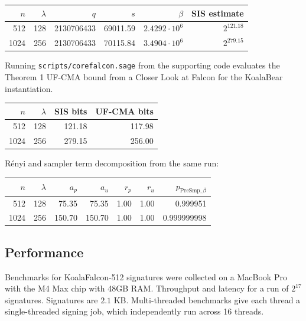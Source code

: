 \begin{center}
\begin{tabular}{@{}rrrrrr@{}}
\toprule
$n$ & $\lambda$ & $q$ & $s$ & $\beta$ & SIS estimate \\
\midrule
512 & 128 & 2130706433 & 69011.59 & $2.4292\cdot 10^6$ & $2^{121.18}$ \\
1024 & 256 & 2130706433 & 70115.84 & $3.4904\cdot 10^6$ & $2^{279.15}$ \\
\bottomrule
\end{tabular}
\end{center}

Running \texttt{scripts/corefalcon.sage} from the supporting code evaluates the Theorem 1 UF-CMA 
bound from a Closer Look at Falcon for the KoalaBear instantiation. 

\begin{center}
\begin{tabular}{@{}rrrr@{}}
\toprule
$n$ & $\lambda$ & SIS bits & UF-CMA bits \\
\midrule
512 & 128 & 121.18 & 117.98 \\
1024 & 256 & 279.15 & 256.00 \\
\bottomrule
\end{tabular}
\end{center}

Rényi and sampler term decomposition from the same run:

\begin{center}
\begin{tabular}{@{}rrrrrrr@{}}
\toprule
$n$ & $\lambda$ & $a_p$ & $a_u$ & $r_p$ & $r_u$ & $p_{\mathrm{PreSmp},\beta}$ \\
\midrule
512 & 128 & 75.35 & 75.35 & 1.00 & 1.00 & 0.999951 \\
1024 & 256 & 150.70 & 150.70 & 1.00 & 1.00 & 0.999999998 \\
\bottomrule
\end{tabular}
\end{center}


\subsection{Performance}

Benchmarks for KoalaFalcon-512 signatures were collected on a MacBook Pro with the M4 Max chip 
with 48GB RAM. Throughput and latency for a run of $2^{17}$ signatures. Signatures are $2.1$ KB. 
Multi-threaded benchmarks give each thread a single-threaded signing job, which independently 
run across 16 threads.

